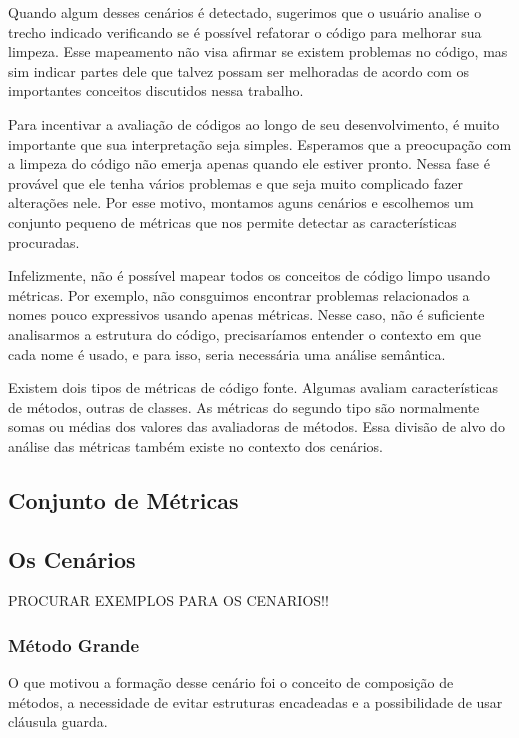 	
	Quando algum desses cenários é detectado, sugerimos que o usuário analise o trecho indicado verificando se é possível refatorar o código para melhorar sua limpeza. Esse mapeamento não visa afirmar se existem problemas no código, mas sim indicar partes dele que talvez possam ser melhoradas de acordo com os importantes conceitos discutidos nessa trabalho.

	Para incentivar a avaliação de códigos ao longo de seu desenvolvimento, é muito importante que sua interpretação seja simples. Esperamos que a preocupação com a limpeza do código não emerja apenas quando ele estiver pronto. Nessa fase é provável que ele tenha vários problemas e que seja muito complicado fazer alterações nele. Por esse motivo, montamos aguns cenários e escolhemos um conjunto pequeno de métricas que nos permite detectar as características procuradas.
	
	Infelizmente, não é possível mapear todos os conceitos de código limpo usando métricas. Por exemplo, não consguimos encontrar problemas relacionados a nomes pouco expressivos usando apenas métricas. Nesse caso, não é suficiente analisarmos a estrutura do código, precisaríamos entender o contexto em que cada nome é usado, e para isso, seria necessária uma análise semântica.

	Existem dois tipos de métricas de código fonte. Algumas avaliam características de métodos, outras de classes. As métricas do segundo tipo são normalmente somas ou médias dos valores das avaliadoras de métodos. Essa divisão de alvo do análise das métricas também existe no contexto dos cenários.


\subsection{Conjunto de Métricas}


\subsection{Os Cenários}

PROCURAR EXEMPLOS PARA OS CENARIOS!!

\subsubsection{Método Grande}
	
	O que motivou a formação desse cenário foi o conceito de composição de métodos, a necessidade de evitar estruturas encadeadas e a possibilidade de usar cláusula guarda.
	
